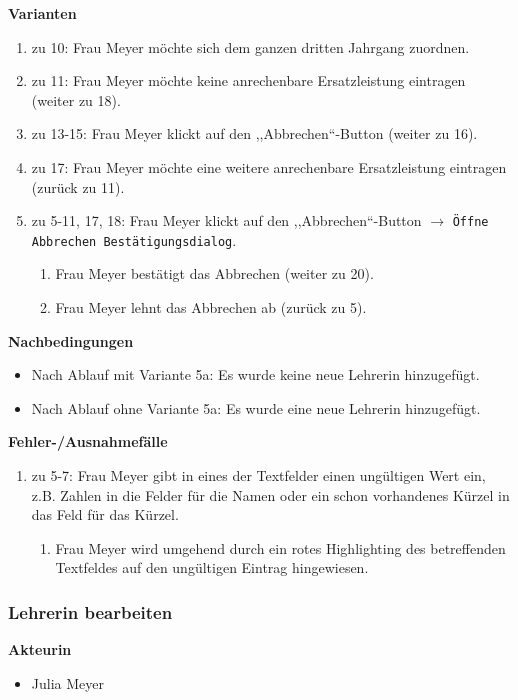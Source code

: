 \documentclass[fontsize=12pt,paper=a4,twoside]{scrartcl}
\begin{document}
\textbf{Varianten}
\begin{enumerate}
\item zu 10: Frau Meyer möchte sich dem ganzen dritten Jahrgang zuordnen.
\item zu 11: Frau Meyer möchte keine anrechenbare Ersatzleistung eintragen (weiter zu 18).
\item zu 13-15: Frau Meyer klickt auf den ,,Abbrechen``-Button (weiter zu 16).
\item zu 17: Frau Meyer möchte eine weitere anrechenbare Ersatzleistung eintragen (zurück zu 11).
\item zu 5-11, 17, 18: Frau Meyer klickt auf den ,,Abbrechen``-Button $\rightarrow$ \texttt{Öffne Abbrechen Bestätigungsdialog}.
	\begin{enumerate}[label={\alph*.}]
	\item Frau Meyer bestätigt das Abbrechen (weiter zu 20).
	\item Frau Meyer lehnt das Abbrechen ab (zurück zu 5).
	\end{enumerate}
\end{enumerate}
\vspace{5pt}


\textbf{Nachbedingungen}
\begin{itemize}
\item Nach Ablauf mit Variante 5a: Es wurde keine neue Lehrerin hinzugefügt.
\item Nach Ablauf ohne Variante 5a: Es wurde eine neue Lehrerin hinzugefügt.
\end{itemize}
\vspace{5pt}

\textbf{Fehler-/Ausnahmefälle}
\begin{enumerate}
\item zu 5-7: Frau Meyer gibt in eines der Textfelder einen ungültigen Wert ein, z.B. Zahlen in die Felder für die Namen oder ein schon vorhandenes Kürzel in das Feld für das Kürzel.
	\begin{enumerate}[label=\arabic*.]
	\item Frau Meyer wird umgehend durch ein rotes Highlighting des betreffenden Textfeldes auf den ungültigen Eintrag hingewiesen.
	\end{enumerate}
\end{enumerate}



\subsubsection{Lehrerin bearbeiten}
\label{subsubsec:LehrerinBearbeiten}
\textbf{Akteurin}
\begin{itemize}
\item Julia Meyer
\end{itemize}
\vspace{5pt}
\end{document}
